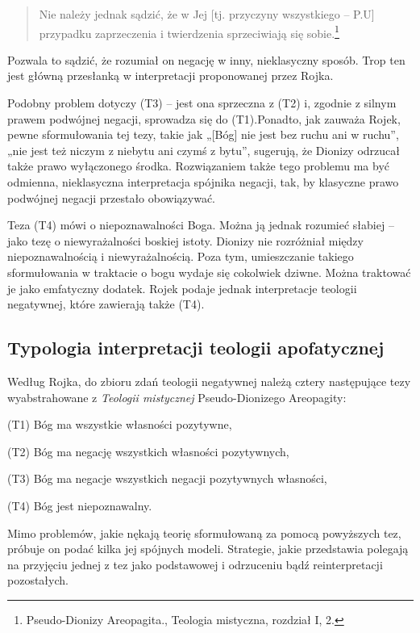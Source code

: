 \begin{quote}
    Nie należy jednak sądzić, że w Jej [tj. przyczyny wszystkiego -- P.U]
przypadku zaprzeczenia i twierdzenia sprzeciwiają się
sobie.\footnote{Pseudo-Dionizy Areopagita., Teologia mistyczna,
rozdział I, 2. }
\end{quote}




Pozwala to sądzić, że rozumiał on negację w inny, nieklasyczny sposób.
Trop ten jest główną przesłanką w interpretacji proponowanej przez
Rojka.

Podobny problem dotyczy (T3) -- jest ona sprzeczna z (T2) i, zgodnie z
silnym prawem podwójnej negacji, sprowadza się do (T1).Ponadto, jak
zauważa Rojek, pewne sformułowania tej tezy, takie jak „[Bóg] nie jest
bez ruchu ani w ruchu”, „nie jest też niczym z niebytu ani czymś z
bytu”, sugerują, że Dionizy odrzucał także prawo wyłączonego środka.
Rozwiązaniem także tego problemu ma być odmienna, nieklasyczna
interpretacja spójnika negacji, tak, by klasyczne prawo podwójnej
negacji przestało obowiązywać.

Teza (T4) mówi o niepoznawalności Boga. Można ją jednak rozumieć słabiej
– jako tezę o niewyrażalności boskiej istoty. Dionizy nie rozróżniał
między niepoznawalnością i niewyrażalnością. Poza tym, umieszczanie
takiego sformułowania w traktacie o bogu wydaje się cokolwiek dziwne.
Można traktować je jako emfatyczny dodatek. Rojek podaje jednak
interpretacje teologii negatywnej, które zawierają także (T4).




\subsection{Typologia interpretacji teologii apofatycznej}

Według Rojka, do zbioru zdań teologii negatywnej należą cztery
następujące tezy wyabstrahowane z \textit{Teologii mistycznej}
Pseudo-Dionizego Areopagity:


\bigskip

\noindent (T1) Bóg ma wszystkie własności pozytywne,

\noindent (T2) Bóg ma negację wszystkich własności pozytywnych,

\noindent (T3) Bóg ma negacje wszystkich negacji pozytywnych własności,

\noindent (T4) Bóg jest niepoznawalny.


\bigskip

Mimo problemów, jakie nękają teorię sformułowaną za pomocą powyższych
tez, próbuje on podać kilka jej spójnych modeli. Strategie, jakie
przedstawia polegają na przyjęciu jednej z tez jako podstawowej i
odrzuceniu bądź reinterpretacji pozostałych.

